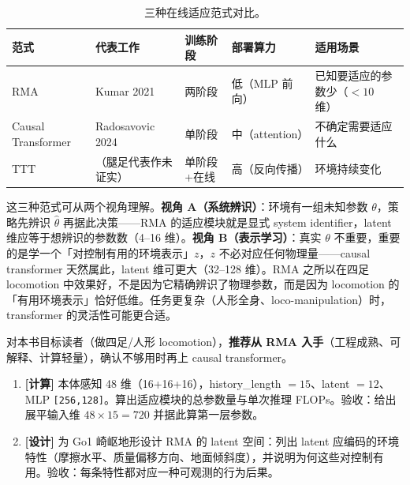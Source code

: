 \begin{table}[H]
\centering
\small
\caption{三种在线适应范式对比。}
\label{tab:rlmc-priv-paradigms}
\begin{tabular}{@{}lllll@{}}
\toprule
范式 & 代表工作 & 训练阶段 & 部署算力 & 适用场景 \\
\midrule
RMA & Kumar 2021 & 两阶段 & 低（MLP 前向） & 已知要适应的参数少（$<10$ 维） \\
Causal Transformer & Radosavovic 2024 & 单阶段 & 中（attention） & 不确定需要适应什么 \\
TTT & （腿足代表作未证实） & 单阶段+在线 & 高（反向传播） & 环境持续变化 \\
\bottomrule
\end{tabular}
\end{table}

\begin{insight}\label{ins:rlmc-priv-dualview}
这三种范式可从两个视角理解。\textbf{视角 A（系统辨识）}：环境有一组未知参数 $\theta$，策略先辨识 $\hat\theta$ 再据此决策——RMA 的适应模块就是显式 system identifier，latent 维应等于想辨识的参数数（4--16 维）。\textbf{视角 B（表示学习）}：真实 $\theta$ 不重要，重要的是学一个「对控制有用的环境表示」$z$，$z$ 不必对应任何物理量——causal transformer 天然属此，latent 维可更大（32--128 维）。RMA 之所以在四足 locomotion 中效果好，不是因为它精确辨识了物理参数，而是因为 locomotion 的「有用环境表示」恰好低维。任务更复杂（人形全身、loco-manipulation）时，transformer 的灵活性可能更合适。
\end{insight}

对本书目标读者（做四足/人形 locomotion），\textbf{推荐从 RMA 入手}（工程成熟、可解释、计算轻量），确认不够用时再上 causal transformer。

\begin{practice}[本节练习]
\begin{enumerate}
  \item \textbf{[计算]} 本体感知 48 维（16+16+16），history\_length $=15$、latent $=12$、MLP \verb|[256,128]|。算出适应模块的总参数量与单次推理 FLOPs。验收：给出展平输入维 $48{\times}15=720$ 并据此算第一层参数。
  \item \textbf{[设计]} 为 Go1 崎岖地形设计 RMA 的 latent 空间：列出 latent 应编码的环境特性（摩擦水平、质量偏移方向、地面倾斜度），并说明为何这些对控制有用。验收：每条特性都对应一种可观测的行为后果。
\end{enumerate}
\end{practice}

